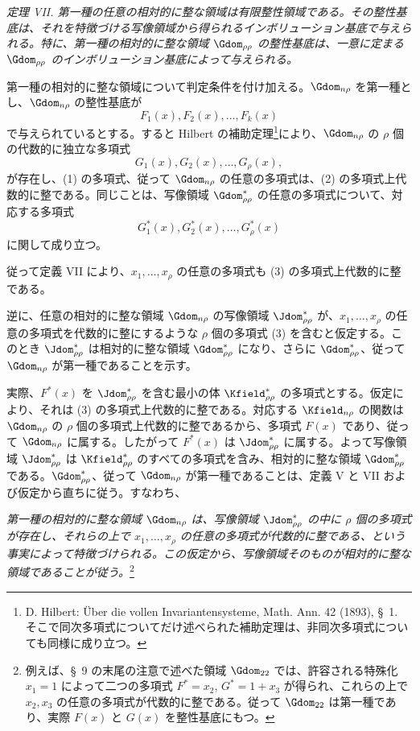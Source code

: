 \documentclass[11pt]{article}
\begin{document}
\emph{定理 VII. 第一種の任意の相対的に整な領域は有限整性領域である。その整性基底は、それを特徴づける写像領域から得られるインボリューション基底で与えられる。特に、第一種の相対的に整な領域 $\Gdom_{\rho\rho}$ の整性基底は、一意に定まる $\Gdom_{\rho\rho}$ のインボリューション基底によって与えられる。}

第一種の相対的に整な領域について判定条件を付け加える。$\Gdom_{n\rho}$ を第一種とし、$\Gdom_{n\rho}$ の整性基底が
\begin{equation}
  F_1(x),F_2(x),\ldots,F_k(x)
\tag{1}
\end{equation}
で与えられているとする。すると Hilbert の補助定理\footnote{D. Hilbert: Über die vollen Invariantensysteme, Math. Ann. 42 (1893), \S\ 1. そこで同次多項式についてだけ述べられた補助定理は、非同次多項式についても同様に成り立つ。}により、$\Gdom_{n\rho}$ の $\rho$ 個の代数的に独立な多項式
\begin{equation}
  G_1(x),G_2(x),\ldots,G_\rho(x),
\tag{2}
\end{equation}
が存在し、(1) の多項式、従って $\Gdom_{n\rho}$ の任意の多項式は、(2) の多項式上代数的に整である。同じことは、写像領域 $\Gdom^*_{\rho\rho}$ の任意の多項式について、対応する多項式
\begin{equation}
  G_1^*(x),G_2^*(x),\ldots,G_\rho^*(x)
\tag{3}
\end{equation}
に関して成り立つ。

従って定義 VII により、$x_1,\ldots,x_\rho$ の任意の多項式も (3) の多項式上代数的に整である。

逆に、任意の相対的に整な領域 $\Gdom_{n\rho}$ の写像領域 $\Jdom^*_{\rho\rho}$ が、$x_1,\ldots,x_\rho$ の任意の多項式を代数的に整にするような $\rho$ 個の多項式 (3) を含むと仮定する。このとき $\Jdom^*_{\rho\rho}$ は相対的に整な領域 $\Gdom^*_{\rho\rho}$ になり、さらに $\Gdom^*_{\rho\rho}$、従って $\Gdom_{n\rho}$ が第一種であることを示す。

実際、$F^*(x)$ を $\Jdom^*_{\rho\rho}$ を含む最小の体 $\Kfield^*_{\rho\rho}$ の多項式とする。仮定により、それは (3) の多項式上代数的に整である。対応する $\Kfield_{n\rho}$ の関数は $\Gdom_{n\rho}$ の $\rho$ 個の多項式上代数的に整であるから、多項式 $F(x)$ であり、従って $\Gdom_{n\rho}$ に属する。したがって $F^*(x)$ は $\Jdom^*_{\rho\rho}$ に属する。よって写像領域 $\Jdom^*_{\rho\rho}$ は $\Kfield^*_{\rho\rho}$ のすべての多項式を含み、相対的に整な領域 $\Gdom^*_{\rho\rho}$ である。$\Gdom^*_{\rho\rho}$、従って $\Gdom_{n\rho}$ が第一種であることは、定義 V と VII および仮定から直ちに従う。すなわち、

\emph{第一種の相対的に整な領域 $\Gdom_{n\rho}$ は、写像領域 $\Jdom^*_{\rho\rho}$ の中に $\rho$ 個の多項式が存在し、それらの上で $x_1,\ldots,x_\rho$ の任意の多項式が代数的に整である、という事実によって特徴づけられる。この仮定から、写像領域そのものが相対的に整な領域であることが従う。}\footnote{例えば、\S\ 9 の末尾の注意で述べた領域 $\Gdom_{22}$ では、許容される特殊化 $x_1=1$ によって二つの多項式 $F^*=x_2$, $G^*=1+x_3$ が得られ、これらの上で $x_2,x_3$ の任意の多項式が代数的に整である。従って $\Gdom_{22}$ は第一種であり、実際 $F(x)$ と $G(x)$ を整性基底にもつ。}
\end{document}
